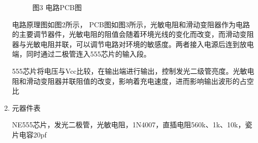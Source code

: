 \documentclass[a4paper,12pt]{article}
\begin{document}
\begin{enumerate}
\begin{figure}[h]
\begin{minipage}{0.5\textwidth}
				\caption*{图3 电路PCB图}
			\end{minipage}
		\end{figure}
		\qquad 电路原理图如图2所示， PCB图如图3所示，光敏电阻和滑动变阻器作为电路的主要调节器件，光敏电阻的阻值会随着环境光线的变化而改变，而滑动变阻器与光敏电阻并联，可以调节电路对环境的敏感度。两者接入电源后连到放电端，同时通过二极管连入555芯片的输入段。\par 
		\qquad 555芯片将电压与Vcc比较，在输出端进行输出，控制发光二级管亮度。光敏电阻和滑动变阻器并联阻值的改变，影响着充电速度，进而影响输出波形的占空比\par 
		\item 元器件表\par 
		\qquad NE555芯片，发光二极管，光敏电阻，1N4007，直插电阻560k、1k、10k，瓷片电容20pf
	\end{enumerate}
\end{document}
